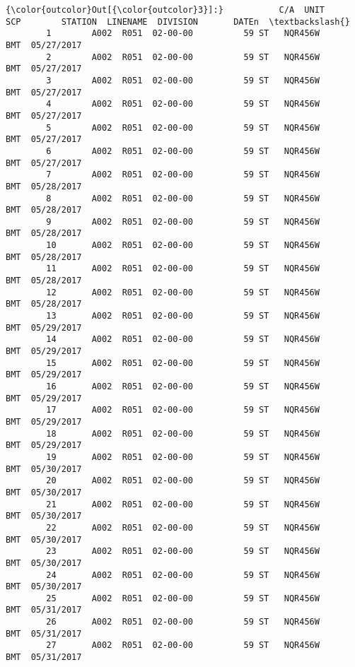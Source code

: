 \documentclass[11pt]{article}
\begin{document}
\begin{Verbatim}[commandchars=\\\{\}]
{\color{outcolor}Out[{\color{outcolor}3}]:}           C/A  UNIT       SCP        STATION  LINENAME  DIVISION       DATEn  \textbackslash{}
        1        A002  R051  02-00-00          59 ST   NQR456W       BMT  05/27/2017   
        2        A002  R051  02-00-00          59 ST   NQR456W       BMT  05/27/2017   
        3        A002  R051  02-00-00          59 ST   NQR456W       BMT  05/27/2017   
        4        A002  R051  02-00-00          59 ST   NQR456W       BMT  05/27/2017   
        5        A002  R051  02-00-00          59 ST   NQR456W       BMT  05/27/2017   
        6        A002  R051  02-00-00          59 ST   NQR456W       BMT  05/27/2017   
        7        A002  R051  02-00-00          59 ST   NQR456W       BMT  05/28/2017   
        8        A002  R051  02-00-00          59 ST   NQR456W       BMT  05/28/2017   
        9        A002  R051  02-00-00          59 ST   NQR456W       BMT  05/28/2017   
        10       A002  R051  02-00-00          59 ST   NQR456W       BMT  05/28/2017   
        11       A002  R051  02-00-00          59 ST   NQR456W       BMT  05/28/2017   
        12       A002  R051  02-00-00          59 ST   NQR456W       BMT  05/28/2017   
        13       A002  R051  02-00-00          59 ST   NQR456W       BMT  05/29/2017   
        14       A002  R051  02-00-00          59 ST   NQR456W       BMT  05/29/2017   
        15       A002  R051  02-00-00          59 ST   NQR456W       BMT  05/29/2017   
        16       A002  R051  02-00-00          59 ST   NQR456W       BMT  05/29/2017   
        17       A002  R051  02-00-00          59 ST   NQR456W       BMT  05/29/2017   
        18       A002  R051  02-00-00          59 ST   NQR456W       BMT  05/29/2017   
        19       A002  R051  02-00-00          59 ST   NQR456W       BMT  05/30/2017   
        20       A002  R051  02-00-00          59 ST   NQR456W       BMT  05/30/2017   
        21       A002  R051  02-00-00          59 ST   NQR456W       BMT  05/30/2017   
        22       A002  R051  02-00-00          59 ST   NQR456W       BMT  05/30/2017   
        23       A002  R051  02-00-00          59 ST   NQR456W       BMT  05/30/2017   
        24       A002  R051  02-00-00          59 ST   NQR456W       BMT  05/30/2017   
        25       A002  R051  02-00-00          59 ST   NQR456W       BMT  05/31/2017   
        26       A002  R051  02-00-00          59 ST   NQR456W       BMT  05/31/2017   
        27       A002  R051  02-00-00          59 ST   NQR456W       BMT  05/31/2017   

\end{Verbatim}
\end{document}
